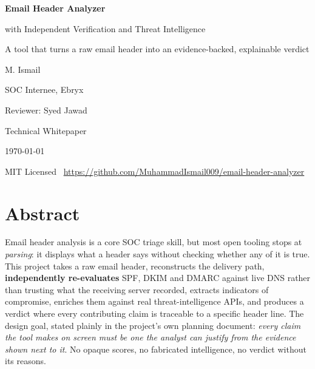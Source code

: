 \documentclass[11pt,a4paper]{article}
\begin{document}
\begin{titlepage}
\centering
\vspace*{3cm}
{\Huge\bfseries Email Header Analyzer\par}
\vspace{0.4cm}
{\Large with Independent Verification and Threat Intelligence\par}
\vspace{1.6cm}
{\large A tool that turns a raw email header into an evidence-backed, explainable verdict\par}
\vspace{2.5cm}
{\large M. Ismail \par}
{\large SOC Internee, Ebryx \par}
\vspace{0.4cm}
{\normalsize Reviewer: Syed Jawad\par}
\vspace{2cm}
{\normalsize Technical Whitepaper \par}
{\normalsize \today \par}
\vfill
{\small MIT Licensed \textbullet\ \url{https://github.com/MuhammadIsmail009/email-header-analyzer} \par}
\end{titlepage}

\tableofcontents
\newpage

\section{Abstract}

Email header analysis is a core SOC triage skill, but most open tooling stops at
\emph{parsing}: it displays what a header says without checking whether any of it is true.
This project takes a raw email header, reconstructs the delivery path, \textbf{independently
re-evaluates} SPF, DKIM and DMARC against live DNS rather than trusting what the receiving
server recorded, extracts indicators of compromise, enriches them against real threat-intelligence
APIs, and produces a verdict where every contributing claim is traceable to a specific header
line. The design goal, stated plainly in the project's own planning document: \emph{every claim
the tool makes on screen must be one the analyst can justify from the evidence shown next to it}.
No opaque scores, no fabricated intelligence, no verdict without its reasons.
\end{document}
